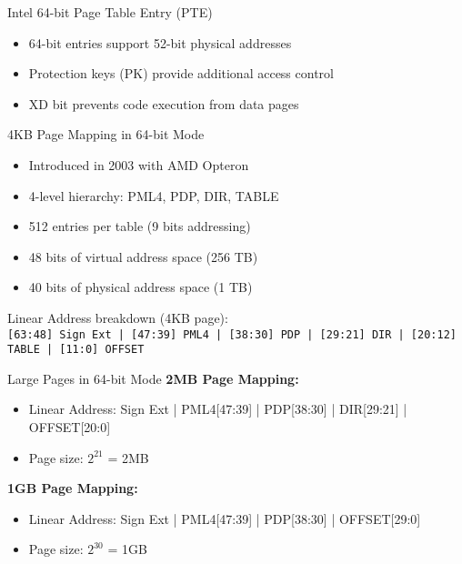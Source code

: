 \documentclass[aspectratio=169,12pt]{beamer}
\begin{document}
\begin{frame}{Intel 64-bit Page Table Entry (PTE)}
\vspace{1em}
\small
\begin{itemize}
  \item 64-bit entries support 52-bit physical addresses
  \item Protection keys (PK) provide additional access control
  \item XD bit prevents code execution from data pages
\end{itemize}
\end{frame}

\begin{frame}{4KB Page Mapping in 64-bit Mode}
\begin{itemize}
    \item Introduced in 2003 with AMD Opteron
    \item 4-level hierarchy: PML4, PDP, DIR, TABLE
    \item 512 entries per table (9 bits addressing)
    \item 48 bits of virtual address space (256 TB)
    \item 40 bits of physical address space (1 TB)
\end{itemize}

\vspace{1em}
Linear Address breakdown (4KB page):\\
\texttt{[63:48] Sign Ext | [47:39] PML4 | [38:30] PDP | [29:21] DIR | [20:12] TABLE | [11:0] OFFSET}
\end{frame}

\begin{frame}{Large Pages in 64-bit Mode}
\textbf{2MB Page Mapping:}
\begin{itemize}
    \item Linear Address: Sign Ext | PML4[47:39] | PDP[38:30] | DIR[29:21] | OFFSET[20:0]
    \item Page size: $2^{21}$ = 2MB
\end{itemize}

\vspace{1em}
\textbf{1GB Page Mapping:}
\begin{itemize}
    \item Linear Address: Sign Ext | PML4[47:39] | PDP[38:30] | OFFSET[29:0]
    \item Page size: $2^{30}$ = 1GB
\end{itemize}
\end{frame}
\end{document}
